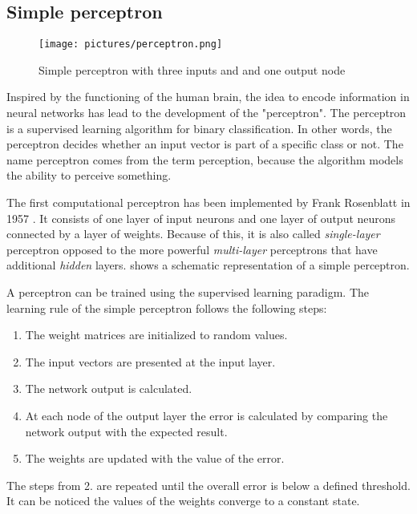 \subsection*{Simple perceptron}
\begin{figure}[ht]
    \centering 
    \texttt{[image: pictures/perceptron.png]}
    \caption{Simple perceptron with three inputs and and one output node \cite{nielsen2015neural}}
    \label{pic:perceptron}    %
\end{figure}
Inspired by the functioning of the human brain, the idea to encode information in neural networks has lead to the development of the "perceptron". The perceptron is a supervised learning algorithm for binary classification. In other words, the perceptron decides whether an input vector is part of a specific class or not. The name perceptron comes from the term perception, because the algorithm models the ability to perceive something. 

The first computational perceptron has been implemented by Frank Rosenblatt in 1957 \cite{Rosenblatt_1957}.  It consists of one layer of input neurons and one layer of output neurons connected by a layer of weights. Because of this, it is also called \textit{single-layer} perceptron opposed to the more powerful \textit{multi-layer} perceptrons that have additional \textit{hidden} layers.  shows a schematic representation of a simple perceptron.

A perceptron can be trained using the supervised learning paradigm. The learning rule of the simple perceptron follows the following steps:

\begin{enumerate}
    \item The weight matrices are initialized to random values.
    \item The input vectors are presented at the input layer.
    \item The network output is calculated.
    \item At each node of the output layer the error is calculated by comparing the network output with the expected result.
    \item The weights are updated with the value of the error.
\end{enumerate}

The steps from 2. are repeated until the overall error is below a defined threshold. It can be noticed the values of the weights converge to a constant state.
\cite{haykin2009neural,Rosenblatt_1957}

